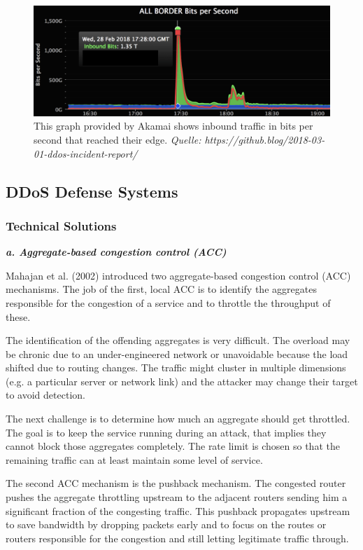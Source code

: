 \begin{figure}[ht]
\begin{center} \includegraphics[scale=0.3]{Talk11/github} \end{center}
\caption{This graph provided by Akamai shows inbound traffic in bits per second that reached their edge. \textit{Quelle: https://github.blog/2018-03-01-ddos-incident-report/}}
\label{fig:github}
\end{figure}

	\subsection{DDoS Defense Systems}
		\subsubsection{Technical Solutions}
\textbf{\textit{a. Aggregate-based congestion control (ACC)}}

Mahajan et al. (2002) introduced two aggregate-based congestion control (ACC) mechanisms. The job of the first, local ACC is to identify the aggregates responsible for the congestion of a service and to throttle the throughput of these.

The identification of the offending aggregates is very difficult. The overload may be chronic due to an under-engineered network or unavoidable because the load shifted due to routing changes. The traffic might cluster in multiple dimensions (e.g. a particular server or network link) and the attacker may change their target to avoid detection.

The next challenge is to determine how much an aggregate should get throttled. The goal is to keep the service running during an attack, that implies they cannot block those aggregates completely. The rate limit is chosen so that the remaining traffic can at least maintain some level of service.

The second ACC mechanism is the pushback mechanism. The congested router pushes the aggregate throttling upstream to the adjacent routers sending him a significant fraction of the congesting traffic. This pushback propagates upstream to save bandwidth by dropping packets early and to focus on the routes or routers responsible for the congestion and still letting legitimate traffic through.

